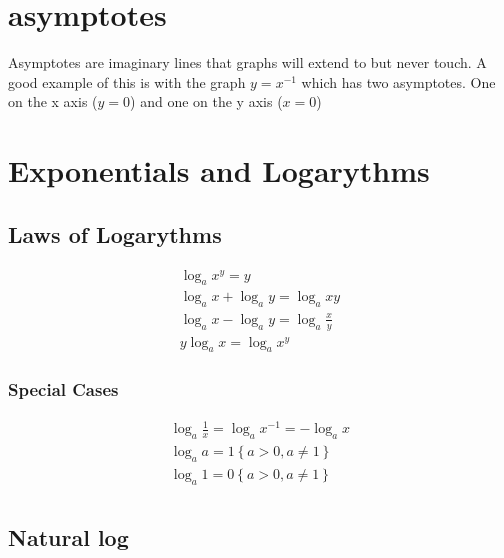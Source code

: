 \documentclass{article}
\begin{document}
\section{asymptotes}
Asymptotes are imaginary lines that graphs will extend to but never touch. A good example of this is with the graph $y=x^{-1}$
which has two asymptotes. One on the x axis ($y = 0$) and one on the y axis ($x = 0$)

\begin{center}
\end{center}

\section{Exponentials and Logarythms}

\subsection{Laws of Logarythms}

\begin{gather}
	\log_{a}{x^y} = y\\
	\log_{a}{x} + \log_{a}{y} = \log_{a}{xy} \\
	\log_{a}{x} - \log_{a}{y} = \log_{a}{\frac{x}{y}} \\
	y\log_{a}{x} = \log_{a}{x^y}
\end{gather}

\subsubsection{Special Cases}

\begin{gather}
	\log_{a}{\frac{1}{x}} = \log_{a}{x^{-1}} = -\log_{a}{x} \\
	\log_{a}{a} = 1 \left \{a > 0, a \ne 1 \right \}\\
	\log_{a}{1} = 0 \left \{a > 0, a \ne 1 \right \}\\
\end{gather}

\subsection{Natural log}
\end{document}
